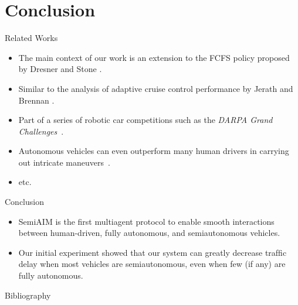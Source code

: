 \documentclass{beamer}
\begin{document}
\section{Conclusion}

\begin{frame}{Related Works}
\begin{itemize}
\item The main context of our work is an extension to the FCFS policy
proposed by Dresner and Stone \cite{bib:Dresner08Multiagent}.
\item Similar to the analysis of adaptive cruise control performance
by Jerath and Brennan \cite{bib:Jerath10adaptive}.
\item Part of a series of robotic car competitions such as the
\emph{DARPA Grand Challenges}~\cite{DARPAGrandChallenge}.
\item Autonomous vehicles can even outperform many human drivers in
carrying out intricate maneuvers~\cite{Squatriglia2010}.
\item etc.
\end{itemize}
\end{frame}

\begin{frame}{Conclusion}
\begin{itemize}
\item SemiAIM is the first multiagent protocol to enable smooth interactions
between human-driven, fully autonomous, and semiautonomous
vehicles.\pause
\item Our initial experiment showed that our system can greatly decrease
trafﬁc delay when most vehicles are semiautonomous, even when few
(if any) are fully autonomous.
\end{itemize}
\end{frame}

\begin{frame}{Bibliography}
\tiny{
}
\end{frame}
\end{document}

